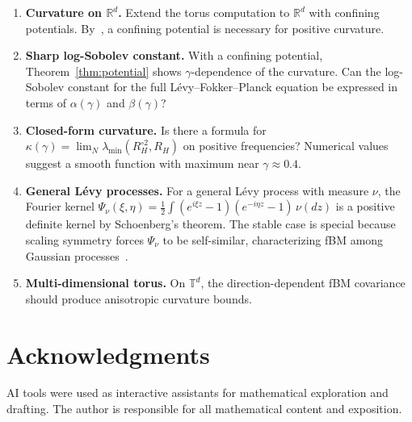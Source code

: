 \documentclass[11pt,a4paper]{article}
\theoremstyle{plain}
\theoremstyle{definition}
\theoremstyle{remark}
\newcommand{\R}{\mathbb{R}}
\newcommand{\T}{\mathbb{T}}
\begin{document}
\begin{enumerate}[label=(\roman*)]
\item \textbf{Curvature on $\R^d$.}
  Extend the torus computation to $\R^d$ with confining potentials.
  By~\cite{SpenerWeberZacher2020}, a confining potential is necessary
  for positive curvature.

\item \textbf{Sharp log-Sobolev constant.}
  With a confining potential, Theorem~\ref{thm:potential} shows
  $\gamma$-dependence of the curvature. Can the log-Sobolev constant
  for the full L\'evy--Fokker--Planck equation be expressed in terms of
  $\alpha(\gamma)$ and $\beta(\gamma)$?

\item \textbf{Closed-form curvature.}
  Is there a formula for
  $\kappa(\gamma) = \lim_N \lambda_{\min}(R_H^{\circ 2}, R_H)$
  on positive frequencies? Numerical values suggest a smooth
  function with maximum near $\gamma \approx 0.4$.

\item \textbf{General L\'evy processes.}
  For a general L\'evy process with measure $\nu$, the
  Fourier kernel
  $\Psi_\nu(\xi,\eta) = \frac{1}{2}\int (e^{i\xi z}-1)(e^{-i\eta z}-1)\,
  \nu(dz)$ is a positive definite kernel by Schoenberg's theorem.
  The stable case is special because scaling symmetry forces
  $\Psi_\nu$ to be self-similar, characterizing fBM among Gaussian
  processes~\cite{Mishura2008}.

\item \textbf{Multi-dimensional torus.}
  On $\T^d$, the direction-dependent fBM covariance should produce
  anisotropic curvature bounds.
\end{enumerate}


\section*{Acknowledgments}
AI tools were used as interactive assistants for mathematical
exploration and drafting. The author
is responsible for all mathematical content and exposition.
\end{document}
